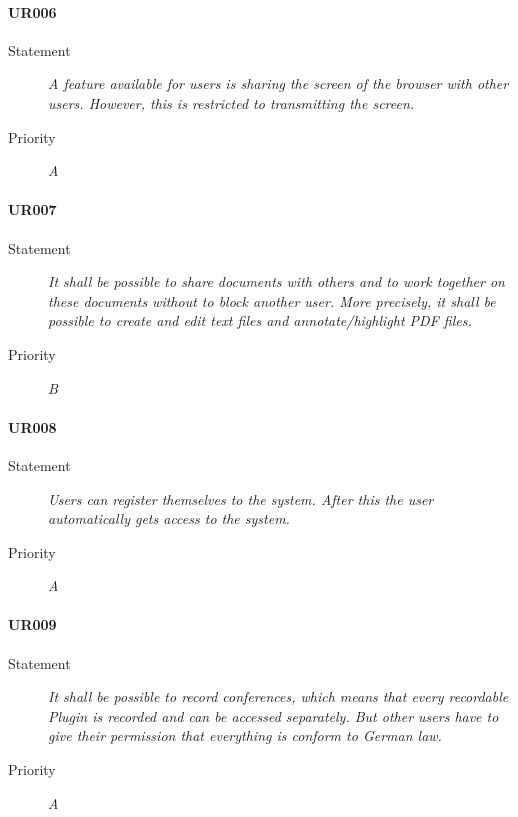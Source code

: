 \paragraph{UR006}
\begin{description}
\item[Statement] \textit{A feature available for users is sharing the screen
    of the browser with other users. However, this is restricted to
    transmitting the screen.}
\item[Priority] \textit{A}
\end{description}

\paragraph{UR007}
\begin{description}
\item[Statement] \textit{It shall be possible to share documents with
    others and to work together on these documents without to block another
    user. More precisely, it shall be possible to create and edit text files
    and annotate/highlight PDF files.}
\item[Priority] \textit{B}
\end{description}

\paragraph{UR008}
\begin{description}
\item[Statement] \textit{Users can register themselves to the system. After this
    the user automatically gets access to the system.}
\item[Priority] \textit{A}
\end{description}

\paragraph{UR009}
\begin{description}
\item[Statement] \textit{It shall be possible to record conferences, which
    means that every recordable Plugin is recorded and can be accessed
    separately. But other users have to give their permission that everything
    is conform to German law.}
\item[Priority] \textit{A}
\end{description}

